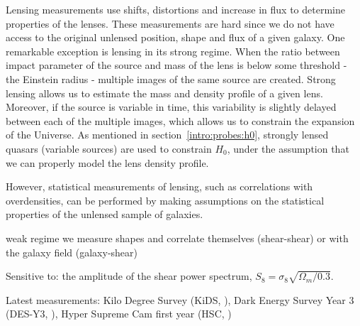    Lensing measurements use shifts, distortions and increase in flux to determine 
    properties of the lenses. These measurements are hard since we do not have access to 
    the original unlensed position, shape and flux of a given galaxy. 
    One remarkable exception is lensing in its strong regime. When the ratio between 
    impact parameter of the source and mass of the lens is below some threshold 
    - the Einstein radius - multiple images of the same source are created. 
    Strong lensing allows us to estimate the mass and density profile of a given lens. 
    Moreover, if the source is variable in time, this variability is slightly delayed 
    between each of the multiple images, which allows us to constrain the expansion 
    of the Universe. As mentioned in section~\ref{intro:probes:h0}, strongly lensed 
    quasars (variable sources) are used to constrain $H_0$, under the assumption 
    that we can properly model the lens density profile. 


    However, statistical measurements of lensing, such as correlations with overdensities, 
    can be performed by making assumptions on the statistical properties of the unlensed 
    sample of galaxies. 

    weak regime we measure shapes and correlate themselves (shear-shear) or with the galaxy field (galaxy-shear)

    Sensitive to: the amplitude of the shear power spectrum, $S_8 = \sigma_8 \sqrt{\Omega_m/0.3}$.

    Latest measurements: 
    Kilo Degree Survey (KiDS, \cite{heymansKiDS1000CosmologyMultiprobe2021}),
    Dark Energy Survey Year 3 (DES-Y3, \cite{descollaborationDarkEnergySurvey2021}), 
    Hyper Supreme Cam first year (HSC, \cite{hikageCosmologyCosmicShear2019})


